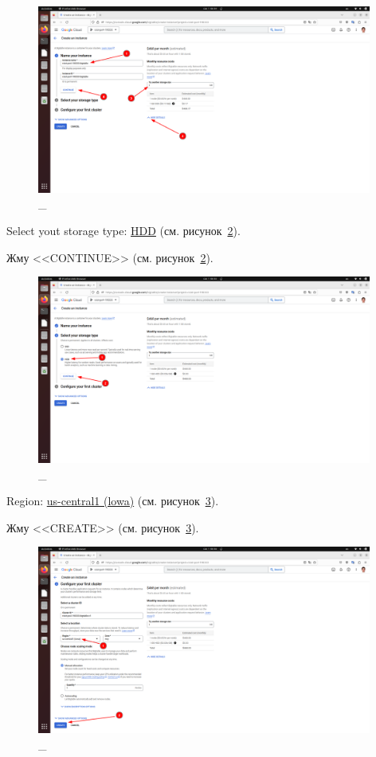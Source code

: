 \documentclass[12pt, a4paper, simple]{eskdtext}
\begin{document}
  \begin{figure}[!h]
    \centering
    \includegraphics[width=11cm]
    {images/GoogleCloudBigTable/2023-03-01_06-55-06.png}
    \caption{\_}
    \label{fig:3}
  \end{figure}

  Select yout storage type: \underline{HDD} (см. рисунок~\ref{fig:4}).

  Жму <<CONTINUE>> (см. рисунок~\ref{fig:4}).

  \begin{figure}[!h]
    \centering
    \includegraphics[width=11cm]
    {images/GoogleCloudBigTable/2023-03-01_06-55-34.png}
    \caption{\_}
    \label{fig:4}
  \end{figure}

  \newpage

  Region: \underline{us-central1 (lowa)} (см. рисунок~\ref{fig:5}).

  Жму <<CREATE>> (см. рисунок~\ref{fig:5}).

  \begin{figure}[!h]
    \centering
    \includegraphics[width=11cm]
    {images/GoogleCloudBigTable/2023-03-01_06-56-40.png}
    \caption{\_}
    \label{fig:5}
  \end{figure}
\end{document}

